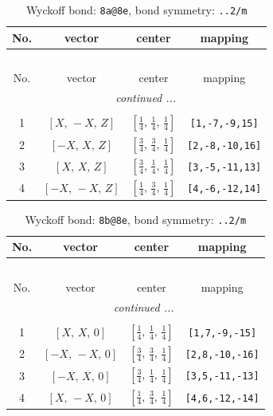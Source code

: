 \documentclass[fleqn,8pt]{jsarticle}
\begin{document}
\begin{longtable}{cccc}
\caption{Wyckoff bond: {\tt 8a@8e}, bond symmetry: {\tt ..2/m}}
 \\
 \hline \hline
No. & vector & center & mapping \\ \hline \endfirsthead

\multicolumn{3}{l}{\tablename\ \thetable{}} \\
 \hline \hline
No. & vector & center & mapping \\ \hline \endhead

 \hline \hline
\multicolumn{3}{r}{\footnotesize\it continued ...} \\ \endfoot

 \hline \hline
\multicolumn{3}{r}{} \\ \endlastfoot

1 & $\left[ X,\, - X,\, Z \right]$ & $\left[ \frac{1}{4},\, \frac{1}{4},\, \frac{1}{4} \right]$ & {\tt [1,-7,-9,15]} \\ \hline
2 & $\left[ - X,\, X,\, Z \right]$ & $\left[ \frac{3}{4},\, \frac{3}{4},\, \frac{1}{4} \right]$ & {\tt [2,-8,-10,16]} \\ \hline
3 & $\left[ X,\, X,\, Z \right]$ & $\left[ \frac{3}{4},\, \frac{1}{4},\, \frac{1}{4} \right]$ & {\tt [3,-5,-11,13]} \\ \hline
4 & $\left[ - X,\, - X,\, Z \right]$ & $\left[ \frac{1}{4},\, \frac{3}{4},\, \frac{1}{4} \right]$ & {\tt [4,-6,-12,14]} \\
\end{longtable}
\renewcommand{\arraystretch}{1.2}
\begin{longtable}{cccc}
\caption{Wyckoff bond: {\tt 8b@8e}, bond symmetry: {\tt ..2/m}}
 \\
 \hline \hline
No. & vector & center & mapping \\ \hline \endfirsthead

\multicolumn{3}{l}{\tablename\ \thetable{}} \\
 \hline \hline
No. & vector & center & mapping \\ \hline \endhead

 \hline \hline
\multicolumn{3}{r}{\footnotesize\it continued ...} \\ \endfoot

 \hline \hline
\multicolumn{3}{r}{} \\ \endlastfoot

1 & $\left[ X,\, X,\, 0 \right]$ & $\left[ \frac{1}{4},\, \frac{1}{4},\, \frac{1}{4} \right]$ & {\tt [1,7,-9,-15]} \\ \hline
2 & $\left[ - X,\, - X,\, 0 \right]$ & $\left[ \frac{3}{4},\, \frac{3}{4},\, \frac{1}{4} \right]$ & {\tt [2,8,-10,-16]} \\ \hline
3 & $\left[ - X,\, X,\, 0 \right]$ & $\left[ \frac{3}{4},\, \frac{1}{4},\, \frac{1}{4} \right]$ & {\tt [3,5,-11,-13]} \\ \hline
4 & $\left[ X,\, - X,\, 0 \right]$ & $\left[ \frac{1}{4},\, \frac{3}{4},\, \frac{1}{4} \right]$ & {\tt [4,6,-12,-14]} \\
\end{longtable}
\end{document}
